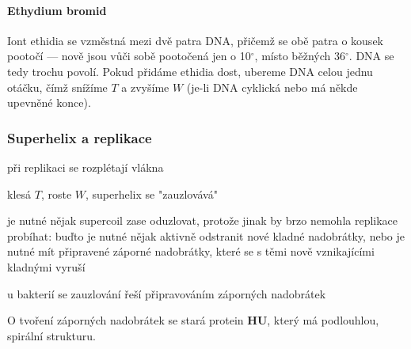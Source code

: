 \documentclass[DIV=8]{scrreprt}
\newcommand{\mybox}[2]{
    \paragraph{#1} #2
}
\begin{document}
\mybox{Ethydium bromid}{Iont ethidia se vzměstná mezi dvě patra DNA, přičemž se obě patra o kousek pootočí --- nově jsou vůči sobě pootočená jen o 10\(^{\circ}\), místo běžných 36\(^{\circ}\). DNA se tedy trochu povolí. Pokud přidáme ethidia dost, ubereme DNA celou jednu otáčku, čímž snížíme \(T\) a zvyšíme \(W\) (je-li DNA cyklická nebo má někde upevněné konce).}


\subsubsection{Superhelix a replikace} \label{Superhelix a replikace}


\begin{myItemize}[nosep]
    \item při replikaci se rozplétají vlákna
\begin{myItemize}[nosep]
    \item klesá \(T\), roste \(W\), superhelix se "zauzlovává"
    \item je nutné nějak supercoil zase oduzlovat, protože jinak by brzo nemohla replikace probíhat: buďto je nutné nějak aktivně odstranit nové kladné nadobrátky, nebo je nutné mít připravené záporné nadobrátky, které se s těmi nově vznikajícími kladnými vyruší
\end{myItemize}

    \item u bakterií se zauzlování řeší připravováním záporných nadobrátek
\end{myItemize}



O tvoření záporných nadobrátek se stará protein \textbf{HU}, který má podlouhlou, spirální strukturu.
\end{document}
